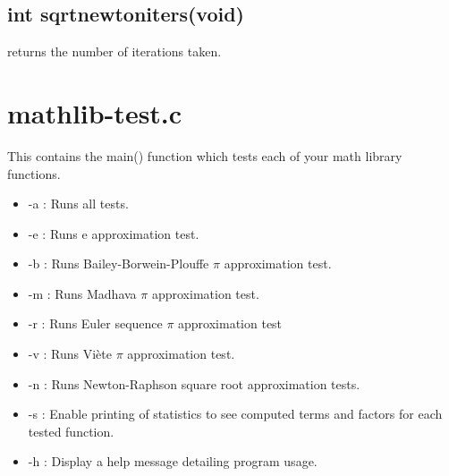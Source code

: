 \documentclass{article}
\begin{document}
\subsection{int sqrt\textunderscore newton\textunderscore iters(void) }
returns the number of iterations taken.
\section{mathlib-test.c}
This contains the main() function which tests each of your math library functions.
 \begin{itemize}
\item -a : Runs all tests.
\item -e : Runs e approximation test.
\item -b : Runs Bailey-Borwein-Plouffe $\pi$ approximation test.
\item -m : Runs Madhava $\pi$ approximation test.
\item -r : Runs Euler sequence $\pi$ approximation test
\item -v : Runs Viète $\pi$ approximation test.
\item -n : Runs Newton-Raphson square root approximation tests.
\item  -s : Enable printing of statistics to see computed terms and factors for each tested function.
\item -h : Display a help message detailing program usage.
 \end{itemize}
\end{document}
